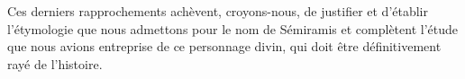 \documentclass[a4paper, 11pt, oneside]{article}
\begin{document}
Ces derniers rapprochements achèvent, croyons-nous, de justifier et d'établir l'étymologie que nous admettons pour le nom de Sémiramis et complètent l'étude que nous avions entreprise de ce personnage divin, qui doit être définitivement rayé de l'histoire.

\bigskip \centerline{\EightStarTaper} \centerline{\EightStarTaper\EightStarTaper} \bigskip
\end{document}
